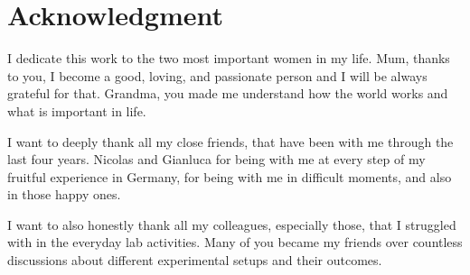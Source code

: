 \chapter{Acknowledgment}
I dedicate this work to the two most important women in my life. Mum, thanks to you, I become a good, loving, and passionate person and I will be always grateful for that. Grandma, you made me understand how the world works and what is important in life. 

I want to deeply thank all my close friends, that have been with me through the last four years. Nicolas and Gianluca for being with me at every step of my fruitful experience in Germany, for being with me in difficult moments, and also in those happy ones.

I want to also honestly thank all my colleagues, especially those, that I struggled with in the everyday lab activities. Many of you became my friends over countless discussions about different experimental setups and their outcomes. 

